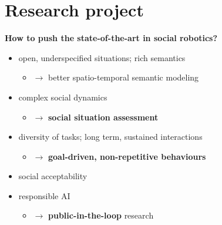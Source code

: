 \documentclass[xcolor=table]{beamer}
\begin{document}


\section{Research project}


\begin{frame}[label=researchquestion]{}

    \begin{center}

    \Large
    \bf How to push the state-of-the-art in social robotics?

    \end{center}

    \begin{itemize}
        \item open, underspecified situations; rich semantics
            \begin{itemize}
                \item<2-> $\rightarrow$ better spatio-temporal semantic modeling
            \end{itemize}
        \item complex social dynamics
            \begin{itemize}
                \item<3-> $\rightarrow$ \textbf{social situation assessment} 
            \end{itemize}
        \item diversity of tasks; long term, sustained interactions
            \begin{itemize}
                \item<4-> $\rightarrow$ \textbf{goal-driven, non-repetitive
                    behaviours}
            \end{itemize}
    \end{itemize}


    \begin{itemize}
        \item<5-> social acceptability
        \item<5-> responsible AI
            \begin{itemize}
                \item<6-> $\rightarrow$ \textbf{public-in-the-loop} research
                    
            \end{itemize}
    \end{itemize}



\end{frame}
\end{document}
